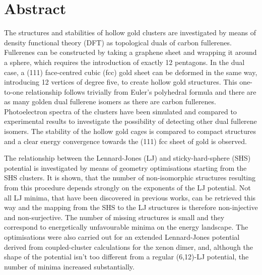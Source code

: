 
\chapter*{Abstract}


The structures and stabilities of hollow gold clusters are investigated by means
of density functional theory (DFT) as topological duals of carbon fullerenes.
Fullerenes can be constructed by taking a graphene sheet and wrapping it around
a sphere, which requires the introduction of exactly 12 pentagons. In the dual
case, a (111) face-centred cubic (fcc) gold sheet can be deformed in the same
way, introducing 12 vertices of degree five, to create hollow gold structures.
This one-to-one relationship follows trivially from Euler's polyhedral formula
and there are as many golden dual fullerene isomers as there are carbon
fullerenes. Photoelectron spectra of the clusters have been simulated and
compared to experimental results to investigate the possibility of detecting
other dual fullerene isomers. The stability of the hollow gold cages is compared
to compact structures and a clear energy convergence towards the (111) fcc sheet
of gold is observed. 

The relationship between the Lennard-Jones (LJ) and sticky-hard-sphere (SHS)
potential is investigated by means of geometry optimisations starting from the
SHS clusters. It is shown, that the number of non-isomorphic structures
resulting from this procedure depends strongly on the exponents of the LJ
potential. Not all LJ minima, that have been discovered in previous works, can
be retrieved this way and the mapping from the SHS to the LJ structures is
therefore non-injective and non-surjective. The number of missing structures is
small and they correspond to energetically unfavourable minima on the energy
landscape. The optimisations were also carried out for an extended Lennard-Jones
potential derived from coupled-cluster calculations for the xenon dimer, and,
although the shape of the potential isn't too different from a regular (6,12)-LJ
potential, the number of minima increased substantially.

